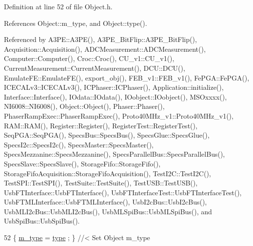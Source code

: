 Definition at line 52 of file Object.\+h.



References Object\+::m\+\_\+type, and Object\+::type().



Referenced by A3\+P\+E\+::\+A3\+P\+E(), A3\+P\+E\+\_\+\+Bit\+Flip\+::\+A3\+P\+E\+\_\+\+Bit\+Flip(), Acquisition\+::\+Acquisition(), A\+D\+C\+Measurement\+::\+A\+D\+C\+Measurement(), Computer\+::\+Computer(), Croc\+::\+Croc(), C\+U\+\_\+v1\+::\+C\+U\+\_\+v1(), Current\+Measurement\+::\+Current\+Measurement(), D\+C\+U\+::\+D\+C\+U(), Emulate\+F\+E\+::\+Emulate\+F\+E(), export\+\_\+obj(), F\+E\+B\+\_\+v1\+::\+F\+E\+B\+\_\+v1(), Fe\+P\+G\+A\+::\+Fe\+P\+G\+A(), I\+C\+E\+C\+A\+Lv3\+::\+I\+C\+E\+C\+A\+Lv3(), I\+C\+Phaser\+::\+I\+C\+Phaser(), Application\+::initialize(), Interface\+::\+Interface(), I\+Odata\+::\+I\+Odata(), I\+Oobject\+::\+I\+Oobject(), M\+S\+Oxxxx(), N\+I6008\+::\+N\+I6008(), Object\+::\+Object(), Phaser\+::\+Phaser(), Phaser\+Ramp\+Exec\+::\+Phaser\+Ramp\+Exec(), Proto40\+M\+Hz\+\_\+v1\+::\+Proto40\+M\+Hz\+\_\+v1(), R\+A\+M\+::\+R\+A\+M(), Register\+::\+Register(), Register\+Test\+::\+Register\+Test(), Seq\+P\+G\+A\+::\+Seq\+P\+G\+A(), Specs\+Bus\+::\+Specs\+Bus(), Specs\+Glue\+::\+Specs\+Glue(), Specs\+I2c\+::\+Specs\+I2c(), Specs\+Master\+::\+Specs\+Master(), Specs\+Mezzanine\+::\+Specs\+Mezzanine(), Specs\+Parallel\+Bus\+::\+Specs\+Parallel\+Bus(), Specs\+Slave\+::\+Specs\+Slave(), Storage\+Fifo\+::\+Storage\+Fifo(), Storage\+Fifo\+Acquisition\+::\+Storage\+Fifo\+Acquisition(), Test\+I2\+C\+::\+Test\+I2\+C(), Test\+S\+P\+I\+::\+Test\+S\+P\+I(), Test\+Suite\+::\+Test\+Suite(), Test\+U\+S\+B\+::\+Test\+U\+S\+B(), Usb\+F\+T\+Interface\+::\+Usb\+F\+T\+Interface(), Usb\+F\+T\+Interface\+Test\+::\+Usb\+F\+T\+Interface\+Test(), Usb\+F\+T\+M\+L\+Interface\+::\+Usb\+F\+T\+M\+L\+Interface(), Usb\+I2c\+Bus\+::\+Usb\+I2c\+Bus(), Usb\+M\+L\+I2c\+Bus\+::\+Usb\+M\+L\+I2c\+Bus(), Usb\+M\+L\+Spi\+Bus\+::\+Usb\+M\+L\+Spi\+Bus(), and Usb\+Spi\+Bus\+::\+Usb\+Spi\+Bus().


\begin{DoxyCode}
52 \{ \hyperlink{classObject_a457a600fe8c00eb1034374f75110a78c}{m\_type}  = \hyperlink{classObject_a84f99f70f144a83e1582d1d0f84e4e62}{type}  ; \} \textcolor{comment}{//< Set Object m\_type}
\end{DoxyCode}
\mbox{\label{classMSOxxxx_af1524bb099b5e559931704d13a1f1126}} 
